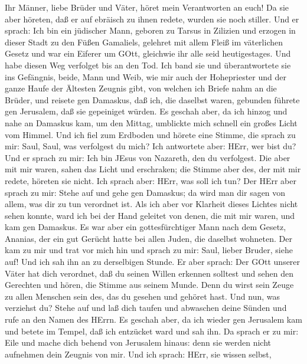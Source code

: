  Ihr Männer, liebe Brüder und Väter, höret mein Verantworten
an euch!  Da sie aber höreten, daß er auf ebräisch zu ihnen
redete, wurden sie noch stiller. Und er sprach:  Ich bin ein
jüdischer Mann, geboren zu Tarsus in Zilizien und erzogen in dieser
Stadt zu den Füßen Gamaliels, gelehret mit allem Fleiß im väterlichen
Gesetz und war ein Eiferer um GOtt, gleichwie ihr alle seid
heutigestages.  Und habe diesen Weg verfolget bis an den
Tod. Ich band sie und überantwortete sie ins Gefängnis, beide, Mann und
Weib,  wie mir auch der Hohepriester und der ganze Haufe der
Ältesten Zeugnis gibt, von welchen ich Briefe nahm an die Brüder, und
reisete gen Damaskus, daß ich, die daselbst waren, gebunden führete gen
Jerusalem, daß sie gepeiniget würden.  Es geschah aber, da
ich hinzog und nahe an Damaskus kam, um den Mittag, umblickte mich
schnell ein großes Licht vom Himmel.  Und ich fiel zum
Erdboden und hörete eine Stimme, die sprach zu mir: Saul, Saul, was
verfolgest du mich?  Ich antwortete aber: HErr, wer bist du?
Und er sprach zu mir: Ich bin JEsus von Nazareth, den du verfolgest.
 Die aber mit mir waren, sahen das Licht und erschraken; die
Stimme aber des, der mit mir redete, höreten sie nicht. 
Ich sprach aber: HErr, was soll ich tun? Der HErr aber sprach zu mir:
Stehe auf und gehe gen Damaskus; da wird man dir sagen von allem, was
dir zu tun verordnet ist.  Als ich aber vor Klarheit dieses
Lichtes nicht sehen konnte, ward ich bei der Hand geleitet von denen,
die mit mir waren, und kam gen Damaskus.  Es war aber ein
gottesfürchtiger Mann nach dem Gesetz, Ananias, der ein gut Gerücht
hatte bei allen Juden, die daselbst wohneten.  Der kam zu
mir und trat vor mich hin und sprach zu mir: Saul, lieber Bruder, siehe
auf! Und ich sah ihn an zu derselbigen Stunde.  Er aber
sprach: Der GOtt unserer Väter hat dich verordnet, daß du seinen Willen
erkennen solltest und sehen den Gerechten und hören, die Stimme aus
seinem Munde.  Denn du wirst sein Zeuge zu allen Menschen
sein des, das du gesehen und gehöret hast.  Und nun, was
verziehst du? Stehe auf und laß dich taufen und abwaschen deine Sünden
und rufe an den Namen des HErrn.  Es geschah aber, da ich
wieder gen Jerusalem kam und betete im Tempel, daß ich entzücket ward
und sah ihn.  Da sprach er zu mir: Eile und mache dich
behend von Jerusalem hinaus: denn sie werden nicht aufnehmen dein
Zeugnis von mir.  Und ich sprach: HErr, sie wissen selbst,
